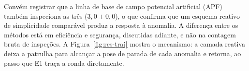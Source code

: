 Convém registrar que a linha de base de campo potencial artificial (APF) também
inspeciona as três ($3{,}0\pm0{,}0$), o que confirma que um esquema reativo de
simplicidade comparável produz a resposta à anomalia. A diferença entre os métodos
está em eficiência e segurança, discutidas adiante, e não na contagem bruta de
inspeções. A Figura~\ref{fig:res-traj} mostra o mecanismo: a camada reativa deixa a
patrulha para alcançar a pose de parada de cada anomalia e retorna, ao passo que E1
traça a ronda diretamente.

